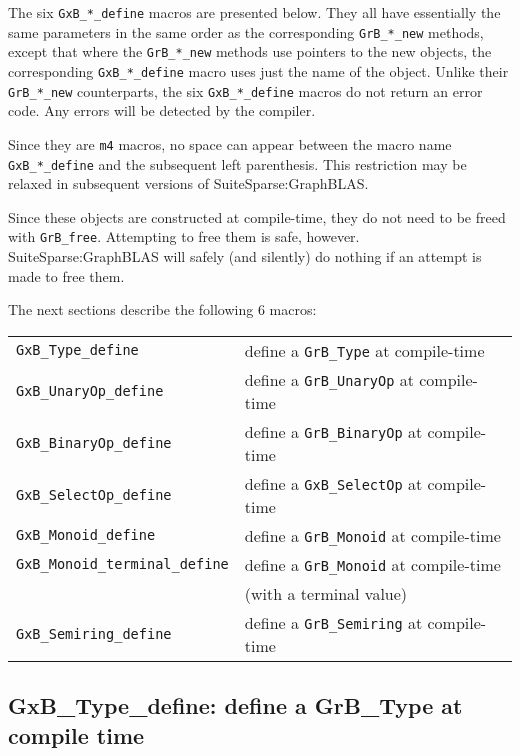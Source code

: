 \documentclass[12pt]{article}
\begin{document}
The six \verb'GxB_*_define' macros are presented below.  They all have
essentially the same parameters in the same order as the corresponding
\verb'GrB_*_new' methods, except that where the \verb'GrB_*_new' methods use
pointers to the new objects, the corresponding \verb'GxB_*_define' macro uses
just the name of the object.  Unlike their \verb'GrB_*_new' counterparts, the
six \verb'GxB_*_define' macros do not return an error code.  Any errors will be
detected by the compiler.

Since they are \verb'm4' macros, no space can appear between the macro name
\verb'GxB_*_define' and the subsequent left parenthesis.  This restriction may
be relaxed in subsequent versions of SuiteSparse:GraphBLAS.

Since these objects are constructed at compile-time, they do not need to be
freed with \verb'GrB_free'.  Attempting to free them is safe, however.
SuiteSparse:GraphBLAS will safely (and silently) do nothing if an attempt is
made to free them.

The next sections describe the following 6 macros:

\vspace{0.2in}
{\footnotesize
\begin{tabular}{ll}
\hline
\verb'GxB_Type_define'      & define a \verb'GrB_Type' at compile-time \\
\verb'GxB_UnaryOp_define'   & define a \verb'GrB_UnaryOp' at compile-time \\
\verb'GxB_BinaryOp_define'  & define a \verb'GrB_BinaryOp' at compile-time \\
\verb'GxB_SelectOp_define'  & define a \verb'GxB_SelectOp' at compile-time \\
\verb'GxB_Monoid_define'    & define a \verb'GrB_Monoid' at compile-time \\
\verb'GxB_Monoid_terminal_define'
    & define a \verb'GrB_Monoid' at compile-time \\
    & (with a terminal value) \\
\verb'GxB_Semiring_define'  & define a \verb'GrB_Semiring' at compile-time \\
\hline
\end{tabular}
}
\vspace{0.2in}

\newpage
\subsection{{\sf GxB\_Type\_define:} define a {\sf GrB\_Type} at compile time}
\label{type_define}
\end{document}
